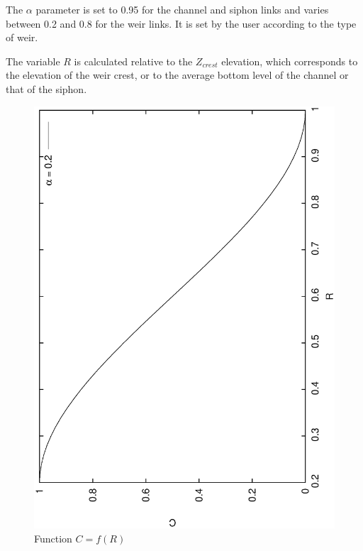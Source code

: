 The $\alpha$ parameter is set to 0.95 for the channel and siphon links and varies between 0.2 and 0.8 for the weir links. It is set by the user according to the type of weir.

\vspace{0.5cm}

The variable $R$ is calculated relative to the $Z_{crest}$ elevation, which corresponds to the elevation of the weir crest, or to the average bottom level of the channel or that of the siphon.

\begin{figure}
  \begin{center}
    \includegraphics[scale=0.5,angle=270]{Figures/CR.eps}
    \caption{Function $C=f(R)$}
  \end{center}
\end{figure}



